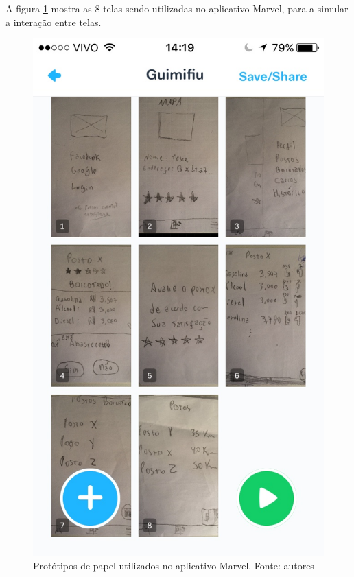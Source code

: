A figura \ref{img:prototipo_de_papel_marvel} mostra as 8 telas sendo utilizadas no aplicativo Marvel, para a simular a interação entre telas.
\begin{figure}[H]
    \centering
    \includegraphics[scale=0.3]{figuras/prototipo_de_paple_marvel.jpg}
    \caption[Protótipos de papel utilizados no aplicativo Marvel]{Protótipos de papel utilizados no aplicativo Marvel. Fonte: autores}
    \label{img:prototipo_de_papel_marvel}
\end{figure}
 \pagebreak

